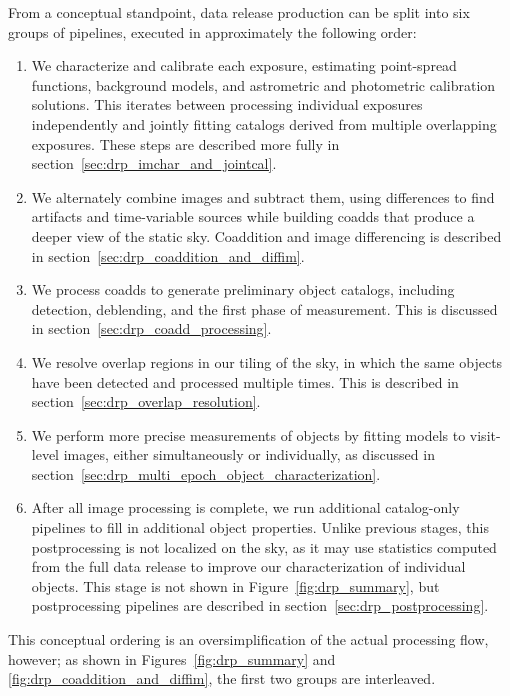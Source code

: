 From a conceptual standpoint, data release production can be split into six groups of pipelines, executed in approximately the following order:
\begin{enumerate}
\item We characterize and calibrate each exposure, estimating point-spread functions, background models, and astrometric and photometric calibration solutions.  This iterates between processing individual exposures independently and jointly fitting catalogs derived from multiple overlapping exposures.  These steps are described more fully in section~\ref{sec:drp_imchar_and_jointcal}.
\item We alternately combine images and subtract them, using differences to find artifacts and time-variable sources while building coadds that produce a deeper view of the static sky.  Coaddition and image differencing is described in section~\ref{sec:drp_coaddition_and_diffim}.
\item We process coadds to generate preliminary object catalogs, including detection, deblending, and the first phase of measurement.  This is discussed in section~\ref{sec:drp_coadd_processing}.
\item We resolve overlap regions in our tiling of the sky, in which the same objects have been detected and processed multiple times.  This is described in section~\ref{sec:drp_overlap_resolution}.
\item We perform more precise measurements of objects by fitting models to visit-level images, either simultaneously or individually, as discussed in section~\ref{sec:drp_multi_epoch_object_characterization}.
\item After all image processing is complete, we run additional catalog-only pipelines to fill in additional object properties.  Unlike previous stages, this postprocessing is not localized on the sky, as it may use statistics computed from the full data release to improve our characterization of individual objects.  This stage is not shown in Figure~\ref{fig:drp_summary}, but postprocessing pipelines are described in section~\ref{sec:drp_postprocessing}.
\end{enumerate}
This conceptual ordering is an oversimplification of the actual processing flow, however; as shown in Figures~\ref{fig:drp_summary} and \ref{fig:drp_coaddition_and_diffim}, the first two groups are interleaved.

